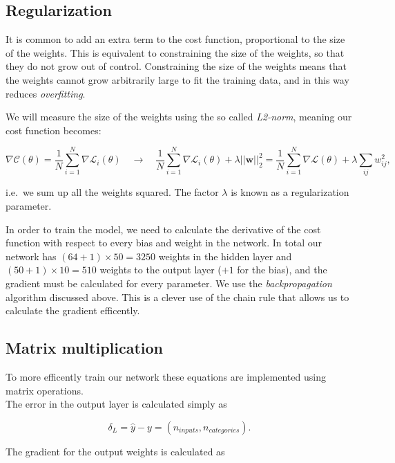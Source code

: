 \documentclass[11pt]{article}
\begin{document}
\hypertarget{regularization}{%
\subsection{Regularization}\label{regularization}}

It is common to add an extra term to the cost function, proportional to
the size of the weights. This is equivalent to constraining the size of
the weights, so that they do not grow out of control. Constraining the
size of the weights means that the weights cannot grow arbitrarily large
to fit the training data, and in this way reduces \emph{overfitting}.

We will measure the size of the weights using the so called
\emph{L2-norm}, meaning our cost function becomes:

\[ \nabla \mathcal{C}(\theta) = \frac{1}{N} \sum_{i=1}^N \nabla \mathcal{L}_i(\theta) \quad \rightarrow \quad
\frac{1}{N} \sum_{i=1}^N \nabla \mathcal{L}_i(\theta) + \lambda \lvert \lvert \boldsymbol{w} \rvert \rvert_2^2 
= \frac{1}{N} \sum_{i=1}^N \nabla \mathcal{L}(\theta) + \lambda \sum_{ij} w_{ij}^2,\]

i.e.~we sum up all the weights squared. The factor \(\lambda\) is known
as a regularization parameter.

In order to train the model, we need to calculate the derivative of the
cost function with respect to every bias and weight in the network. In
total our network has \((64 + 1)\times 50=3250\) weights in the hidden
layer and \((50 + 1)\times 10=510\) weights to the output layer (\(+1\)
for the bias), and the gradient must be calculated for every parameter.
We use the \emph{backpropagation} algorithm discussed above. This is a
clever use of the chain rule that allows us to calculate the gradient
efficently.

\hypertarget{matrix-multiplication}{%
\subsection{Matrix multiplication}\label{matrix-multiplication}}

To more efficently train our network these equations are implemented
using matrix operations.\\
The error in the output layer is calculated simply as

\[ \delta_L = \hat{y} - y = (n_{inputs}, n_{categories}) .\]

The gradient for the output weights is calculated as
\end{document}
